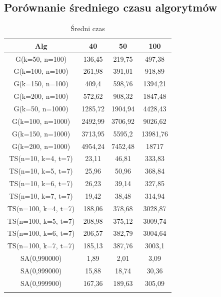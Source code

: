 \documentclass[wide,a4paper,titlepage,12pt] {article}
\begin{document}
\subsection{Porównanie średniego czasu algorytmów}
\begin{center}
    \begin{longtable}{|c|c|c|c|}
        \hline
        Alg & 40 & 50 & 100 \\ \hline
        G(k=50, n=100) & 136,45 & 219,75 & 497,38\\ \hline
        G(k=100, n=100)& 261,98 & 391,01 & 918,89\\ \hline
        G(k=150, n=100)& 409,4 &  598,76 & 1394,21\\ \hline
        G(k=200, n=100)& 572,62 & 908,32 & 1847,48\\ \hline
        G(k=50, n=1000)& 1285,72& 1904,94& 4428,43\\ \hline
        G(k=100, n=1000)  &  2492,99 &3706,92& 9026,62\\ \hline
        G(k=150, n=1000)   & 3713,95 &5595,2  &13981,76\\ \hline
        G(k=200, n=1000)   & 4954,24& 7452,48& 18717\\ \hline
        TS(n=10, k=4, t=7) & 23,11 &  46,81 &  333,83\\ \hline
        TS(n=10, k=5, t=7) & 25,96 &  50,96 &  368,84\\ \hline
        TS(n=10, k=6, t=7) & 26,23 &  39,14 &  327,85\\ \hline
        TS(n=10, k=7, t=7) & 19,42  & 38,48  & 314,94\\ \hline
        TS(n=100, k=4, t=7)& 188,06 & 378,68 & 3028,87\\ \hline
        TS(n=100, k=5, t=7)& 208,98 & 375,12 & 3009,74\\ \hline
        TS(n=100, k=6, t=7)& 206,57 & 382,79 & 3004,64\\ \hline
        TS(n=100, k=7, t=7) &185,13  &387,76 & 3003,1\\ \hline
        SA(0,990000)  &  1,89  &  2,01 &   3,09\\ \hline
        SA(0,999000)  &  15,88 &  18,74 &  30,36\\ \hline
        SA(0,999900)  &  167,36 & 189,63 & 305,09\\ \hline
                \caption{Średni czas}
    \end{longtable}
    
\end{center}
\end{document}
